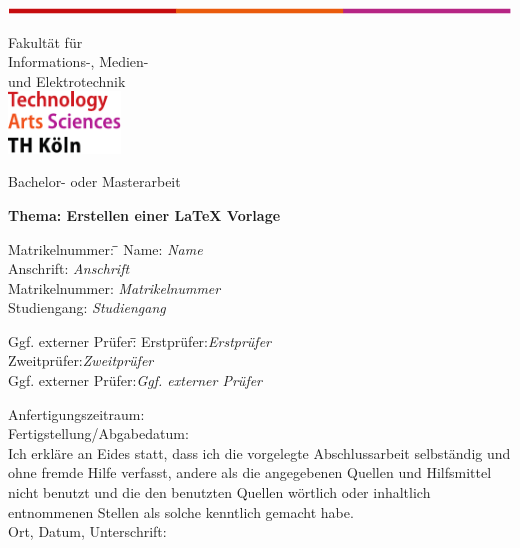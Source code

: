 \begin{titlepage}
\vspace*{-20ex}
\includegraphics[width=\textwidth]{grafiken/Linie}\\[2ex]
{\sffamily 
Fakultät für\\
Informations-, Medien-\\
und Elektrotechnik\\[10ex]
\includegraphics[width=3cm]{grafiken/thk}\\
\begin{center}
 \Huge  Bachelor- oder Masterarbeit\\[4ex]
\end{center}
\Large
\textbf{Thema: Erstellen einer LaTeX Vorlage}
\large 
\begin{tabbing}
Matrikelnummer: \hspace*{2ex}\= \=\kill
Name: \> \textit{Name}\\
Anschrift:\> \textit{Anschrift}\\
Matrikelnummer:\> \textit{Matrikelnummer}	\\	
Studiengang:\> \textit{Studiengang}\\
\end{tabbing}
\begin{tabbing}
Ggf. externer Prüfer:\hspace*{2ex}\= \=\kill
Erstprüfer:\>\textit{Erstprüfer}\\			
Zweitprüfer:\>\textit{Zweitprüfer}\\
Ggf. externer Prüfer:\>\textit{Ggf. externer Prüfer} \\
\end{tabbing}
Anfertigungszeitraum:\\
Fertigstellung/Abgabedatum:\\[5ex]
%
Ich erkläre an Eides statt, dass ich die vorgelegte Abschlussarbeit selbständig 
und ohne fremde Hilfe verfasst, andere als die angegebenen Quellen und 
Hilfsmittel nicht benutzt und die den benutzten Quellen wörtlich oder inhaltlich 
entnommenen Stellen als solche kenntlich gemacht habe.\\[6ex]
%
Ort, Datum, Unterschrift: \hrulefill
}
\normalsize
\end{titlepage}

